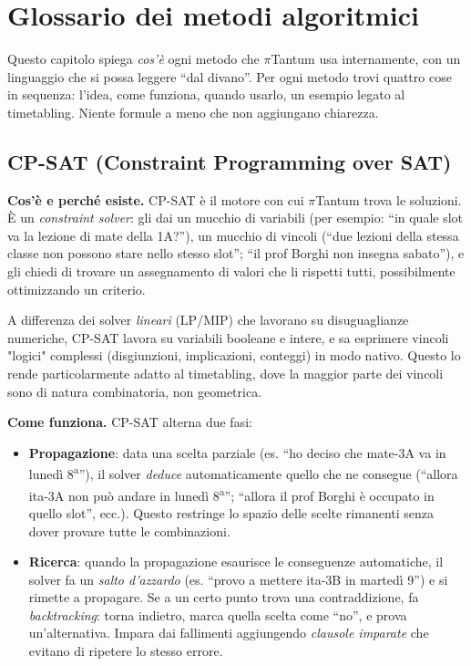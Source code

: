 \chapter{Glossario dei metodi algoritmici}
\label{ch:glossario_discorsivo}

Questo capitolo spiega \emph{cos'\`e} ogni metodo che $\pi$Tantum
usa internamente, con un linguaggio che si possa leggere
``dal divano''. Per ogni metodo trovi quattro cose in
sequenza: l'idea, come funziona, quando usarlo, un esempio
legato al timetabling. Niente formule a meno che non aggiungano
chiarezza.

\section{CP-SAT (Constraint Programming over SAT)}

\textbf{Cos'\`e e perch\'e esiste.} CP-SAT \`e il motore con cui
$\pi$Tantum trova le soluzioni. \`E un \emph{constraint
solver}: gli dai un mucchio di variabili (per esempio: ``in
quale slot va la lezione di mate della 1A?''), un mucchio di
vincoli (``due lezioni della stessa classe non possono stare
nello stesso slot''; ``il prof Borghi non insegna sabato''),
e gli chiedi di trovare un assegnamento di valori che li
rispetti tutti, possibilmente ottimizzando un criterio.

A differenza dei solver \emph{lineari} (LP/MIP) che lavorano
su disuguaglianze numeriche, CP-SAT lavora su variabili
booleane e intere, e sa esprimere vincoli "logici" complessi
(disgiunzioni, implicazioni, conteggi) in modo nativo. Questo
lo rende particolarmente adatto al timetabling, dove la
maggior parte dei vincoli sono di natura combinatoria, non
geometrica.

\textbf{Come funziona.} CP-SAT alterna due fasi:
\begin{itemize}
\item \textbf{Propagazione}: data una scelta parziale (es. ``ho
  deciso che mate-3A va in luned\`i 8\textsuperscript{a}''),
  il solver \emph{deduce} automaticamente quello che ne
  consegue (``allora ita-3A non pu\`o andare in luned\`i
  8\textsuperscript{a}''; ``allora il prof Borghi \`e occupato
  in quello slot'', ecc.). Questo restringe lo spazio delle
  scelte rimanenti senza dover provare tutte le combinazioni.
\item \textbf{Ricerca}: quando la propagazione esaurisce le
  conseguenze automatiche, il solver fa un \emph{salto
  d'azzardo} (es. ``provo a mettere ita-3B in marted\`i 9'')
  e si rimette a propagare. Se a un certo punto trova una
  contraddizione, fa \emph{backtracking}: torna indietro,
  marca quella scelta come ``no'', e prova un'alternativa.
  Impara dai fallimenti aggiungendo \emph{clausole imparate}
  che evitano di ripetere lo stesso errore.
\end{itemize}

